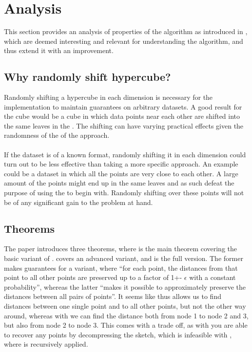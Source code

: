\section{Analysis}
\label{analysis}
This section provides an analysis of properties of the \qs{} algorithm as introduced in \cite{wagner17}, which are deemed interesting and relevant for understanding the algorithm, and thus extend it with an improvement.


\subsection{Why randomly shift hypercube?}
Randomly shifting a hypercube in each dimension is necessary for the \qs{} implementation to maintain guarantees on arbitrary datasets. A good result for the cube would be a cube in which data points near each other are shifted into the same leaves in the \qt{}. The shifting can have varying practical effects given the randomness of the of the approach.
\\
\\
If the dataset is of a known format, randomly shifting it in each dimension could turn out to be less effective than taking a more specific approach. An example could be a dataset in which all the points are very close to each other. A large amount of the points might end up in the same leaves and as such defeat the purpose of using the \qt{} to begin with. Randomly shifting over these points will not be of any significant gain to the problem at hand.

\subsection{Theorems}
The paper introduces three theorems, where  is the main theorem covering the basic variant of \qs{}.  covers an advanced variant, and  is the full version. The former makes guarantees for a \qs{} variant, where “for each point, the distances from that point to all other points are preserved up to a factor of 1+- $\epsilon$ with a constant probability”, whereas the latter “makes it possible to approximately preserve the distances between all pairs of points”. It seems like  thus allows us to find distances between one single point and to all other points, but not the other way around, whereas with  we can find the distance both from node 1 to node 2 and 3, but also from node 2 to node 3. This comes with a trade off, as with  you are able to recover any points by decompressing the sketch, which is infeasible with , where \qs{} is recursively applied.
